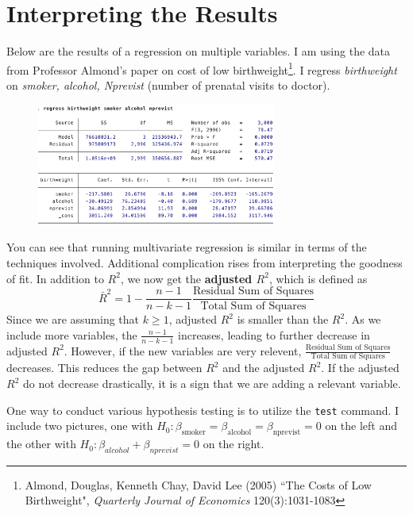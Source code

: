 \section{Interpreting the Results}
Below are the results of a regression on multiple variables. I am using the data from Professor Almond's paper on cost of low birthweight\footnote{Almond, Douglas, Kenneth Chay, David Lee (2005) ``The Costs of Low Birthweight", \textit{Quarterly Journal of Economics} 120(3):1031-1083}. I regress \textit{birthweight} on \textit{smoker, alcohol, Nprevist} (number of prenatal visits to doctor).
\begin{figure}[H]
\begin{center}
\includegraphics[width=0.7\textwidth]{regoutput.png}
\end{center}
\end{figure}\par\medskip
You can see that running multivariate regression is similar in terms of the techniques involved. Additional complication rises from interpreting the goodness of fit. In addition to $R^2$, we now get the \textbf{adjusted $R^2$}, which is defined as
\[
\bar{R}^2 = 1-\frac{n-1}{n-k-1}\frac{\text{Residual Sum of Squares}}{\text{Total Sum of Squares}}
\]
Since we are assuming that $k\geq 1$, adjusted $R^2$ is smaller than the $R^2$. As we include more variables, the $\frac{n-1}{n-k-1}$ increases, leading to further decrease in adjusted $R^2$. However, if the new variables are very relevent, $\frac{\text{Residual Sum of Squares}}{\text{Total Sum of Squares}}$ decreases. This reduces the gap between $R^2$ and the adjusted $R^2$. If the adjusted $R^2$ do not decrease drastically, it is a sign that we are adding a relevant variable. \par\medskip
One way to conduct various hypothesis testing is to utilize the \texttt{test} command. I include two pictures, one with $H_0: \beta_{\text{smoker}}=\beta_{\text{alcohol}}=\beta_{\text{nprevist}}=0$ on the left and the other with $H_0:\beta_{alcohol}+\beta_{nprevist}=0$ on the right.
